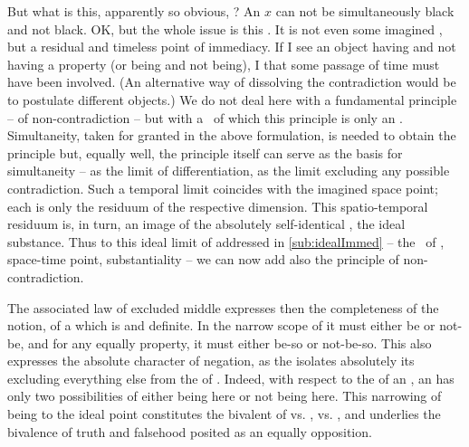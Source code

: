 \label{pa:immedNexus}
But what is this, apparently so obvious, ? An $x$ can not
be simultaneously black and not black. OK, but the whole issue is this
. It is not even some imagined , but a residual and timeless point of immediacy. If I see an object
having and not having a property (or being and not being), I  that
some passage of time must have been involved. (An alternative way of dissolving
the contradiction would be to postulate different objects.) We do not deal here
with a fundamental principle -- of non-contradiction -- but with a \nexus\ of
which this principle is only an . Simultaneity, taken for granted in
the above formulation, is needed to obtain the principle but, equally well, the
principle itself can serve as the basis for  simultaneity -- as
the limit of differentiation, as the limit excluding any possible contradiction.
Such a temporal limit coincides with the imagined space point; each is only the
 residuum of the respective dimension. This spatio-temporal residuum
is, in turn, an image of the absolutely self-identical , the ideal
substance. Thus to this ideal limit of  addressed in
\ref{sub:idealImmed} -- the \nexus\ of , space-time point,
substantiality -- we can now add also the principle of non-contradiction.

The associated law of excluded middle expresses then the completeness of the
notion, of a  which is  and definite. In the narrow
scope of  it must either be or not-be, and for any equally
 property, it must either be-so or not-be-so.  This also expresses
the absolute character of negation, as the  isolates
absolutely its  excluding everything else from the  of
.  Indeed, with respect to the  of an , an
 has only two possibilities of either being here or not being here.
This narrowing of being to the ideal point constitutes the bivalent
 of  vs. ,  vs. , and
underlies the bivalence of truth and falsehood posited as an equally
 opposition.

  
